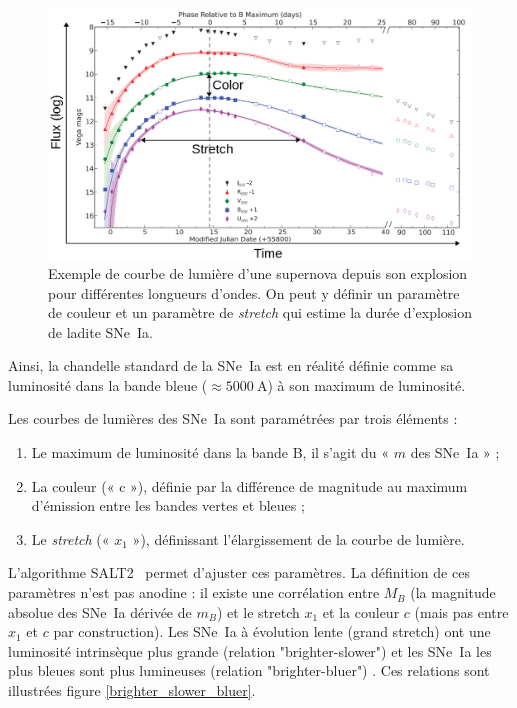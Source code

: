 \documentclass[a4paper, 12pt, svgnames]{article}
\begin{document}
\begin{figure}[htbp!]
    \centering
    \includegraphics[width=.7\linewidth]{Rapport_figures/lightcurve.png}
    \captionsetup{justification=centering}
    \caption{Exemple de courbe de lumière d'une supernova depuis son explosion
    pour différentes longueurs d'ondes. On peut y définir un paramètre de
couleur et un paramètre de \textit{stretch} qui estime la durée d'explosion de
ladite SNe~Ia. \cite{pereira_spectrophotometric_2013}}
    \label{fig:lightcurves}
\end{figure}

Ainsi, la chandelle standard de la SNe~Ia est en réalité définie comme sa
luminosité dans la bande bleue ($\approx \SI{5000}{\A}$) à son maximum de
luminosité. \bigbreak

Les courbes de lumières des SNe~Ia sont paramétrées par trois éléments :

\begin{enumerate}
    \item Le maximum de luminosité dans la bande B, il s'agit du « $m$ des
        SNe~Ia » ;
    \item La couleur (« c »), définie par la différence de magnitude au maximum
        d'émission entre les bandes vertes et bleues ;
    \item Le \textit{stretch} (« $x_1$ »), définissant l'élargissement de la
        courbe de lumière.
\end{enumerate}

L'algorithme SALT2~\cite{guy_salt2_2007, guy_supernova_2010} permet d'ajuster
ces paramètres. La définition de ces paramètres n'est pas anodine : il existe
une corrélation entre $M_B$ (la magnitude absolue des SNe~Ia dérivée de $m_B$)
et le stretch $x_1$ et la couleur $c$ (mais pas entre $x_1$ et $c$ par
construction). Les SNe~Ia à évolution lente (grand stretch) ont une luminosité
intrinsèque plus grande (relation "brighter-slower")
\cite{phillips_absolute_1999} et les SNe~Ia les plus bleues sont plus lumineuses
(relation "brighter-bluer") \cite{tripp_two-parameter_1998, riess_first_2006}.
Ces relations sont illustrées figure \ref{brighter_slower_bluer}. \bigbreak
\end{document}
